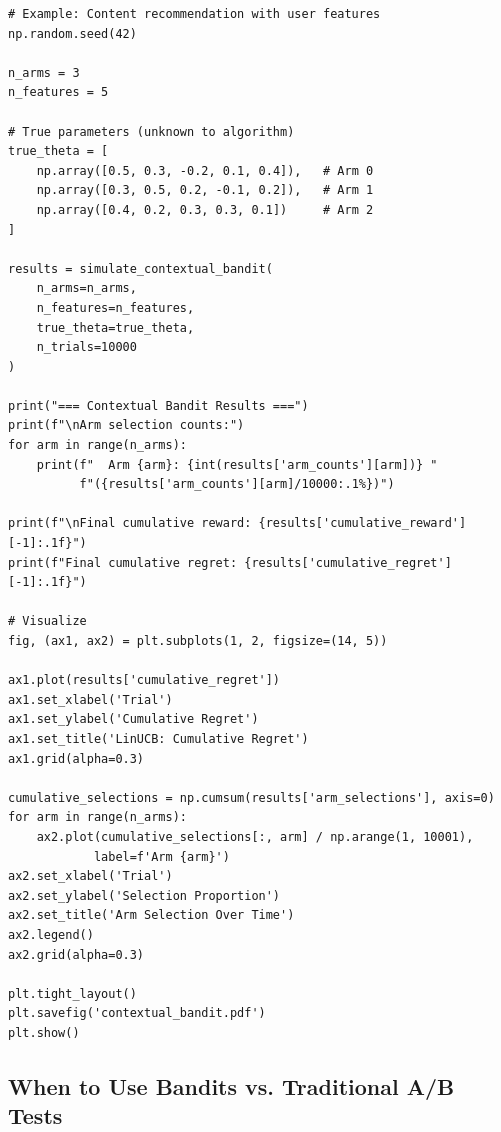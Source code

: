 \begin{lstlisting}
# Example: Content recommendation with user features
np.random.seed(42)

n_arms = 3
n_features = 5

# True parameters (unknown to algorithm)
true_theta = [
    np.array([0.5, 0.3, -0.2, 0.1, 0.4]),   # Arm 0
    np.array([0.3, 0.5, 0.2, -0.1, 0.2]),   # Arm 1
    np.array([0.4, 0.2, 0.3, 0.3, 0.1])     # Arm 2
]

results = simulate_contextual_bandit(
    n_arms=n_arms,
    n_features=n_features,
    true_theta=true_theta,
    n_trials=10000
)

print("=== Contextual Bandit Results ===")
print(f"\nArm selection counts:")
for arm in range(n_arms):
    print(f"  Arm {arm}: {int(results['arm_counts'][arm])} "
          f"({results['arm_counts'][arm]/10000:.1%})")

print(f"\nFinal cumulative reward: {results['cumulative_reward'][-1]:.1f}")
print(f"Final cumulative regret: {results['cumulative_regret'][-1]:.1f}")

# Visualize
fig, (ax1, ax2) = plt.subplots(1, 2, figsize=(14, 5))

ax1.plot(results['cumulative_regret'])
ax1.set_xlabel('Trial')
ax1.set_ylabel('Cumulative Regret')
ax1.set_title('LinUCB: Cumulative Regret')
ax1.grid(alpha=0.3)

cumulative_selections = np.cumsum(results['arm_selections'], axis=0)
for arm in range(n_arms):
    ax2.plot(cumulative_selections[:, arm] / np.arange(1, 10001),
            label=f'Arm {arm}')
ax2.set_xlabel('Trial')
ax2.set_ylabel('Selection Proportion')
ax2.set_title('Arm Selection Over Time')
ax2.legend()
ax2.grid(alpha=0.3)

plt.tight_layout()
plt.savefig('contextual_bandit.pdf')
plt.show()
\end{lstlisting}

\subsection{When to Use Bandits vs. Traditional A/B Tests}

